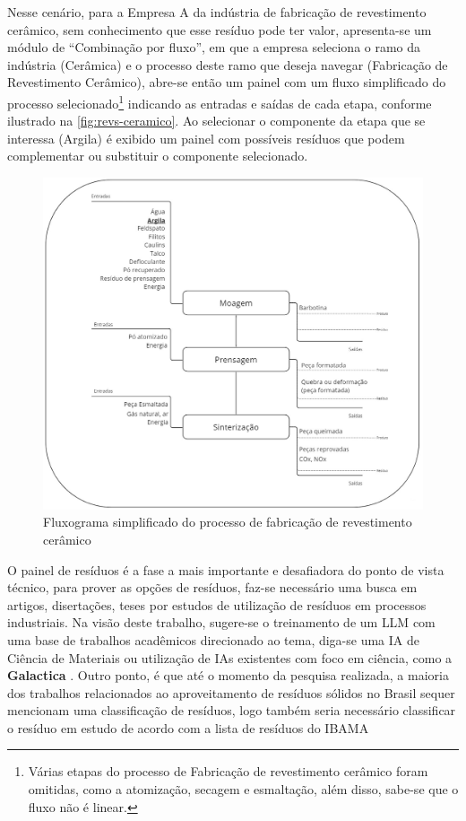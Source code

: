 Nesse cenário, para a Empresa A da indústria de fabricação de revestimento cerâmico, sem conhecimento que esse resíduo pode ter valor, apresenta-se um módulo de “Combinação por fluxo”, em que a empresa seleciona o ramo da indústria (Cerâmica) e o processo deste ramo que deseja navegar (Fabricação de Revestimento Cerâmico), abre-se então um painel com um fluxo simplificado do processo selecionado\footnote{Várias etapas do processo de Fabricação de revestimento cerâmico foram omitidas, como a atomização, secagem e esmaltação, além disso, sabe-se que o fluxo não é linear.}  indicando as entradas e saídas de cada etapa, conforme ilustrado na \autoref{fig:revs-ceramico}. Ao selecionar o componente da etapa que se interessa (Argila) é exibido um painel com possíveis resíduos que podem complementar ou substituir o componente selecionado. 

\begin{figure}[htb]
	\caption{\label{fig:revs-ceramico} Fluxograma simplificado do processo de fabricação de revestimento cerâmico}
	\begin{center}
		\includegraphics[scale=0.46]{images/revs-ceramico.jpg}
	\end{center}
\end{figure}

O painel de resíduos é a fase a mais importante e desafiadora do ponto de vista técnico, para prover as opções de resíduos, faz-se necessário uma busca em artigos, disertações, teses por estudos de utilização de resíduos em processos industriais. Na visão deste trabalho, sugere-se o treinamento de um \gls{LLM} com uma base de trabalhos acadêmicos direcionado ao tema, diga-se uma \gls{IA} de Ciência de Materiais ou utilização de \gls{IA}s existentes com foco em ciência, como a \textbf{Galactica} \cite{taylor_galactica_2022}. Outro ponto, é que até o momento da pesquisa realizada, a maioria dos trabalhos relacionados ao aproveitamento de resíduos sólidos no Brasil sequer mencionam uma classificação de resíduos, logo também seria necessário classificar o resíduo em estudo de acordo com a lista de resíduos do \gls{IBAMA}

